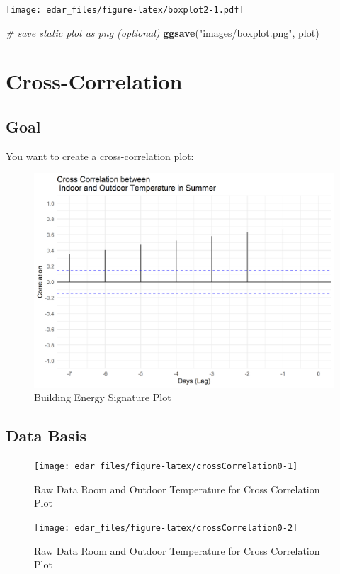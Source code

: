 \documentclass[
  a4paperpaper,
]{book}
\newenvironment{Shaded}{\begin{snugshade}}{\end{snugshade}}
\newcommand{\CommentTok}[1]{\textcolor[rgb]{0.56,0.35,0.01}{\textit{#1}}}
\newcommand{\KeywordTok}[1]{\textcolor[rgb]{0.13,0.29,0.53}{\textbf{#1}}}
\newcommand{\NormalTok}[1]{#1}
\newcommand{\StringTok}[1]{\textcolor[rgb]{0.31,0.60,0.02}{#1}}
\let\oldShaded\Shaded
\let\endoldShaded\endShaded
\renewenvironment{Shaded}{\footnotesize\oldShaded}{\endoldShaded}
\begin{document}
\texttt{[image: edar\_files/figure-latex/boxplot2-1.pdf]}

\begin{Shaded}
\begin{Highlighting}[]
\CommentTok{# save static plot as png (optional)}
\KeywordTok{ggsave}\NormalTok{(}\StringTok{"images/boxplot.png"}\NormalTok{, plot)}
\end{Highlighting}
\end{Shaded}

\newpage

\hypertarget{cross-correlation}{%
\section{Cross-Correlation}\label{cross-correlation}}

\hypertarget{goal-1}{%
\subsection{Goal}\label{goal-1}}

You want to create a cross-correlation plot:

\begin{figure}
\includegraphics[width=0.7\linewidth]{images/crossCorrelation} \caption{Building Energy Signature Plot}\label{fig:unnamed-chunk-10}
\end{figure}

\hypertarget{data-basis-1}{%
\subsection{Data Basis}\label{data-basis-1}}

\begin{figure}
\texttt{[image: edar\_files/figure-latex/crossCorrelation0-1]} \caption{Raw Data Room and Outdoor Temperature for Cross Correlation Plot}\label{fig:crossCorrelation0-1}
\end{figure}
\begin{figure}
\texttt{[image: edar\_files/figure-latex/crossCorrelation0-2]} \caption{Raw Data Room and Outdoor Temperature for Cross Correlation Plot}\label{fig:crossCorrelation0-2}
\end{figure}
\end{document}
